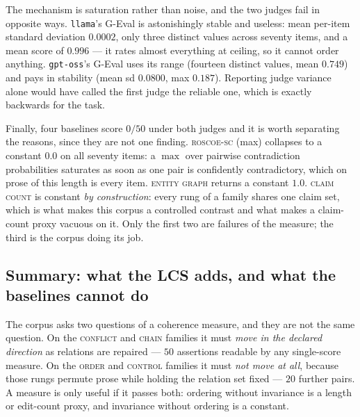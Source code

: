 The mechanism is saturation rather than noise, and the two judges fail in opposite ways.
\texttt{llama}'s G-Eval is astonishingly stable and useless: mean per-item standard deviation
$0.0002$, only three distinct values across seventy items, and a mean score of $0.996$ --- it rates
almost everything at ceiling, so it cannot order anything. \texttt{gpt-oss}'s G-Eval uses its range
(fourteen distinct values, mean $0.749$) and pays in stability (mean sd $0.0800$, max $0.187$).
Reporting judge variance alone would have called the first judge the reliable one, which is exactly
backwards for the task.

Finally, four baselines score $0/50$ under both judges and it is worth separating the reasons, since
they are not one finding. \textsc{roscoe-sc} (max) collapses to a constant $0.0$ on all seventy items: a
$\max$ over pairwise contradiction probabilities saturates as soon as one pair is confidently
contradictory, which on prose of this length is every item. \textsc{entity graph} returns a constant
$1.0$. \textsc{claim count} is constant
\emph{by construction}: every rung of a family shares one claim set, which is what makes this corpus
a controlled contrast and what makes a claim-count proxy vacuous on it. Only the first two are
failures of the measure; the third is the corpus doing its job.

\subsection{Summary: what the LCS adds, and what the baselines cannot do}
\label{sec-summary}

The corpus asks two questions of a coherence measure, and they are not the same question. On the
\textsc{conflict} and \textsc{chain} families it must \emph{move in the declared direction} as
relations are repaired --- $50$ assertions readable by any single-score measure. On the
\textsc{order} and \textsc{control} families it must \emph{not move at all}, because those rungs
permute prose while holding the relation set fixed --- $20$ further pairs. A measure is only useful if
it passes both: ordering without invariance is a length or edit-count proxy, and invariance without
ordering is a constant.

